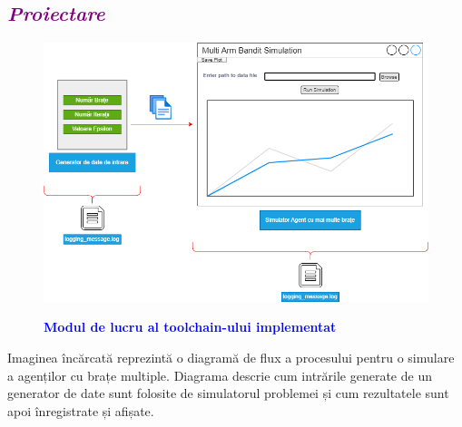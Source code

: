 \documentclass{article}
\begin{document}
\textcolor{purple}{\subsection{\itshape \textcolor{purple}{Proiectare}}}
\begin{figure}[h]
    \centering
    \includegraphics[width=1\linewidth]{toolchain workflow.drawio.png}
    \bfseries\caption{\textcolor{blue}{\textbf{Modul de lucru al toolchain-ului implementat}}}
\end{figure}
Imaginea încărcată reprezintă o diagramă de flux a procesului pentru o simulare a agenților cu brațe multiple. Diagrama descrie cum intrările generate de un generator de date sunt folosite de simulatorul problemei și cum rezultatele sunt apoi înregistrate și afișate.\\
\end{document}
